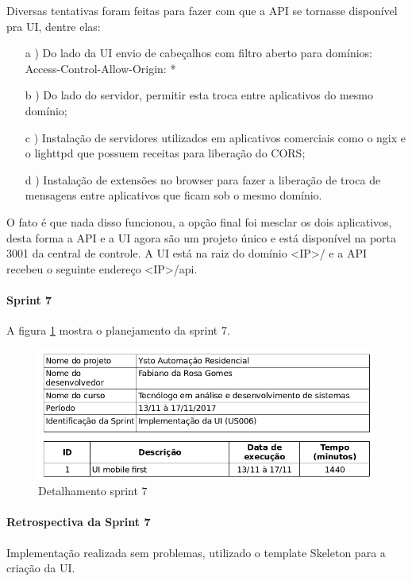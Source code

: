 Diversas tentativas foram feitas para fazer com que a API se tornasse disponível pra UI, dentre elas:

\begin{itemize}
    \item[a]) Do lado da UI envio de cabeçalhos com filtro aberto para domínios: Access-Control-Allow-Origin: *
    \item[b]) Do lado do servidor, permitir esta troca entre aplicativos do mesmo domínio;
    \item[c]) Instalação de servidores utilizados em aplicativos comerciais como o ngix e o lighttpd que possuem receitas para liberação do CORS;
    \item[d]) Instalação de extensões no browser para fazer a liberação de troca de mensagens entre aplicativos que ficam sob o mesmo domínio.
\end{itemize}

O fato é que nada disso funcionou, a opção final foi mesclar os dois aplicativos, desta forma a API e a UI agora são um projeto único e está disponível na porta 3001 da central de controle. A UI está na raiz do domínio <IP>/ e a API recebeu o seguinte endereço <IP>/api.

\paragraph{Sprint 7} A figura \ref{sprint-7} mostra o planejamento da sprint 7.

\begin{figure}[H]
\caption{\label{sprint-7} Detalhamento sprint 7}
\includegraphics[scale=0.5]{img/sprint-7.png}
\end{figure}

\paragraph{Retrospectiva da Sprint 7}
Implementação realizada sem problemas, utilizado o template Skeleton \cite{SKELETON} para a criação da UI.

